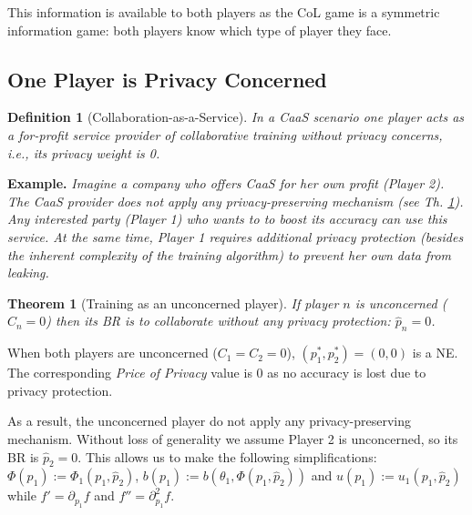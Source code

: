 \documentclass[USenglish,oneside,twocolumn]{article}
\theoremstyle{plain}
\newtheorem{theorem}{Theorem}
\newtheorem{definition}{Definition}
\begin{document}
    This information is available to both players as the CoL game is a symmetric information game: both players know which type of player they face.
    
    \vspace{-0.5cm}
    \subsection{One Player is Privacy Concerned}
    \vspace{-0.25cm}
    \begin{definition}[Collaboration-as-a-Service]
        \label{def:caas}
        In a CaaS scenario one player acts as a for-profit service provider of collaborative training without privacy concerns, i.e., its privacy weight is 0. 
    \end{definition}
    \vspace{-0.25cm}
    
    \textbf{Example.} \textit{Imagine a company who offers CaaS for her own profit (Player 2). The CaaS provider does not apply any privacy-preserving mechanism (see Th. \ref{th:unc}). Any interested party (Player 1) who wants to to boost its accuracy can use this service. At the same time, Player 1 requires additional privacy protection (besides the inherent complexity of the training algorithm) to prevent her own data from leaking.}
    
    \vspace{-0.25cm}
    \begin{theorem}[Training as an unconcerned player]
        \label{th:unc}
        If player $n$ is unconcerned ($C_n=0$) then its BR is to collaborate without any privacy protection: $\hat{p}_n=0$.
    \end{theorem}
    \vspace{-0.25cm}
    
    When both players are unconcerned ($C_1=C_2=0$), $(p_1^*,p_2^*)=(0,0)$ is a NE. The corresponding \textit{Price of Privacy} value is 0 as no accuracy is lost due to privacy protection.
    
    As a result, the unconcerned player do not apply any privacy-preserving mechanism. Without loss of generality we assume Player 2 is unconcerned, so its BR is $\hat{p}_2=0$. This allows us to make the following simplifications: $\Phi(p_1):=\Phi_1(p_1,\hat{p}_2)$, $b(p_1):=b(\theta_1,\Phi(p_1,\hat{p}_2))$ and $u(p_1):=u_1(p_1,\hat{p}_2)$ while $f'=\partial_{p_1}f$ and $f''=\partial^2_{p_1}f$.
    
\end{document}
